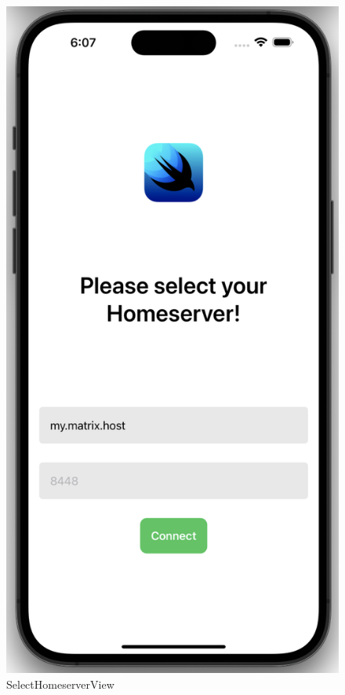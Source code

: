     \begin{figure}[h]
        \includegraphics[scale=0.5]{selecthomeserver}
        \centering
        \caption{SelectHomeserverView}\label{fig:selecthomeserverview}
    \end{figure}
